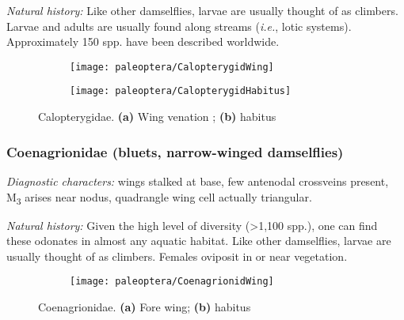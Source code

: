 \noindent{}\textit{Natural history:} Like other damselflies, larvae are usually thought of as climbers. Larvae and adults are usually found along streams (\textit{i.e.}, lotic systems). Approximately 150 spp. have been described worldwide.\vspace{3mm}

\begin{figure}[ht!]
    \centering
    \begin{subfigure}[ht!]{0.45\textwidth}
        \texttt{[image: paleoptera/CalopterygidWing]}
        \caption{}
        \label{fig:calopwing}
    \end{subfigure}
    \hfill
    \begin{subfigure}[ht!]{0.45\textwidth}
        \texttt{[image: paleoptera/CalopterygidHabitus]}
        \caption{}
        \label{fig:calopbody}
    \end{subfigure}
    \caption{Calopterygidae. \textbf{(a)} Wing venation \citep[][Fig. 235]{comstock1918wings}; \textbf{(b)} habitus \citep[redrawn from][Plate XLVIII, Fig. 2]{bhlitem82229}}\label{fig:calop}
\end{figure}

\subsubsection{Coenagrionidae (bluets, narrow-winged damselflies)}
\noindent{}\textit{Diagnostic characters:} wings stalked at base, few antenodal crossveins present, \texorpdfstring{M\textsubscript{3}}{ }{ } arises near nodus, quadrangle wing cell actually triangular.\vspace{3mm}

\noindent{}\textit{Natural history:} Given the high level of diversity (\textgreater1,100 spp.), one can find these odonates in almost any aquatic habitat. Like other damselflies, larvae are usually thought of as climbers. Females oviposit in or near vegetation.\vspace{3mm}

\begin{figure}[ht!]
    \centering
    \begin{subfigure}[ht!]{0.45\textwidth}
        \texttt{[image: paleoptera/CoenagrionidWing]}
        \caption{}
        \label{fig:coenwing}
    \end{subfigure}
    \hfill
    \begin{subfigure}[ht!]{0.5\textwidth}
        \caption{}
        \label{fig:coenbody}
    \end{subfigure}
    \caption{Coenagrionidae. \textbf{(a)} Fore wing; \textbf{(b)} habitus \citep[redrawn from][Fig. 4:71a]{bhlitem126080aquatic}}\label{fig:coenag}
\end{figure}

